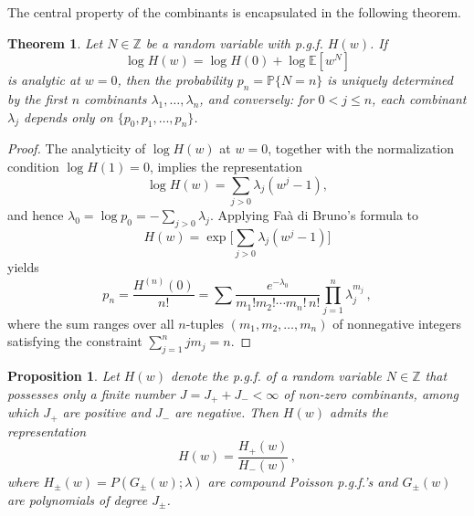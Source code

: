 \documentclass[a4paper,12pt]{amsart}
\newtheorem{Theorem}{Theorem}[section]
\newtheorem{Proposition}{Proposition}[section]
\theoremstyle{definition}
\theoremstyle{remark}
\begin{document}
The central property of the combinants is encapsulated in the following theorem.
\begin{Theorem}
\label{comb2pmf}
Let $N \in \mathbb{Z}$ be a random variable with p.g.f. $H(w)$. If
\[
\log H(w)=\log H(0)+ \log \mathbb{E}[w^N]
\]
is analytic at $w=0$, then the probability $p_n=\mathbb{P}\{N=n\}$ is uniquely determined by the first $n$ combinants $\lambda_1, \ldots, \lambda_n$, and {\it conversely}: for $0<j\leq n$, each combinant $\lambda_j$ depends only on 
$\{p_0,p_1,\ldots,p_n\}$.
\end{Theorem}
\begin{proof}
The analyticity of $\log H(w)$ at $w=0$, together with the normalization condition $\log H(1)=0$, implies the representation
\[
\log H(w)= \sum_{j>0}\lambda_j( w^j -1),
\]
and hence $\lambda_0=\log p_0=-\sum_{j>0}\lambda_j$. Applying Faà di Bruno’s formula to
\[
H(w)=\exp\Big[\sum_{j>0}\lambda_j( w^j -1)\Big]
\]
yields
\begin{equation}\label{FdB}
p_n=\frac{H^{(n)}(0)}{n!} =  \sum \frac{e^{-\lambda_0}}{m_1!m_2!\cdots m_n! \, n!} \prod_{j=1}^{n}\lambda_j^{m_j}\,,
\end{equation}
where the sum ranges over all $n$-tuples $(m_1,m_2,\ldots, m_n)$ of nonnegative integers satisfying the constraint $\sum_{j=1}^{n} j m_j =n$.
\end{proof}
\begin{Proposition}\label{fincumul}
Let $H(w)$ denote the p.g.f. of a random variable $N \in \mathbb{Z}$ that possesses only a finite number $J = J_{+} + J_{-} < \infty$ of non-zero combinants, among which $J_{+}$ are positive and $J_{-}$ are negative. Then $H(w)$ admits the representation
\[
H(w) = \frac{H_{+}(w)}{H_{-}(w)}\,,
\]
where $H_{\pm}(w) = P(G_{\pm}(w);\lambda)$ are compound Poisson p.g.f.'s and $G_{\pm}(w)$ are polynomials of degree $J_{\pm}$.
\end{Proposition}
\end{document}

